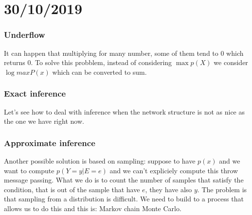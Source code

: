 \chapter{30/10/2019}
\subsection{Underflow}
It can happen that multiplying for many number, some of them tend to 0 which returns 0. To solve this probblem, instead of considering $\max{p(X)}$ we consider $\log{max{P(x)}}$ which can be converted to sum. 
\subsection{Exact inference}
Let's see how to deal with inference when the network structure is not as nice as the one we have right now. 
\subsection{Approximate inference}
Another possible solution is based on sampling: suppose to have $p(x)$ and we want to compute $p(Y=y\vert E=e)$ and we can't expliciely compute this throw message passing. What we do is to count the number of samples that satisfy the condition, that is out of the sample that have $e$, they have also $y$. The problem is that sampling from a distribution is difficult. We need to build to a process that allows us to do this and this is: Markov chain Monte Carlo. 
